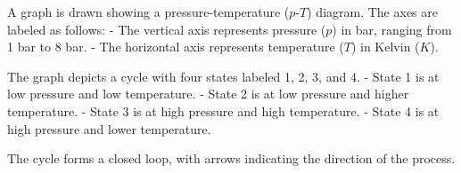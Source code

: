 A graph is drawn showing a pressure-temperature (\(p\)-\(T\)) diagram. The axes are labeled as follows:  
- The vertical axis represents pressure (\(p\)) in bar, ranging from 1 bar to 8 bar.  
- The horizontal axis represents temperature (\(T\)) in Kelvin (\(K\)).  

The graph depicts a cycle with four states labeled 1, 2, 3, and 4.  
- State 1 is at low pressure and low temperature.  
- State 2 is at low pressure and higher temperature.  
- State 3 is at high pressure and high temperature.  
- State 4 is at high pressure and lower temperature.  

The cycle forms a closed loop, with arrows indicating the direction of the process.